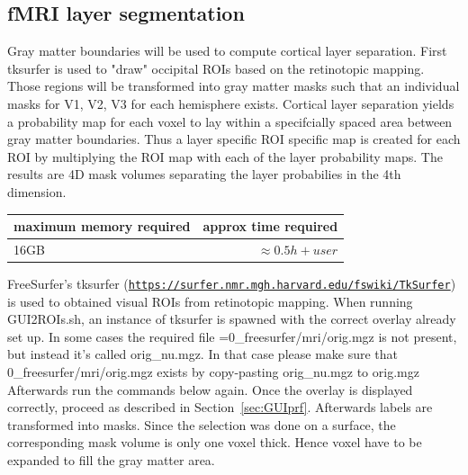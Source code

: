 \documentclass[12pt,a4paper]{scrartcl}
\begin{document}
\subsection{fMRI layer segmentation}
Gray matter boundaries will be used to compute cortical layer separation. First tksurfer is used to "draw" occipital ROIs based on the retinotopic mapping. Those regions will be transformed into gray matter masks such that an individual masks for V1, V2, V3 for each hemisphere exists. Cortical layer separation yields a probability map for each voxel to lay within a specifcially spaced area between gray matter boundaries. Thus a layer specific ROI specific map is created for each ROI by multiplying the ROI map with each of the layer probability maps. The results are 4D mask volumes separating the layer probabilies in the 4th dimension.
\begin{table}[h]
\begin{tabular}{l | r}
\toprule
maximum memory required & approx time required\\\toprule
16GB & $\approx 0.5h+user$ \\\bottomrule
\end{tabular}
\end{table}
\FloatBarrier
FreeSurfer's tksurfer (\href{https://surfer.nmr.mgh.harvard.edu/fswiki/TkSurfer}{\nolinkurl{https://surfer.nmr.mgh.harvard.edu/fswiki/TkSurfer}}) is used to obtained visual ROIs from retinotopic mapping. When running GUI2ROIs.sh, an instance of tksurfer is spawned with the correct overlay already set up. In some cases the required file =0\_freesurfer/mri/orig.mgz is not present, but instead it's called orig\_nu.mgz. In that case please make sure that 0\_freesurfer/mri/orig.mgz exists by copy-pasting orig\_nu.mgz to orig.mgz\\
Afterwards run the commands below again. Once the overlay is displayed correctly, proceed as described in Section~\ref{sec:GUIprf}. Afterwards labels are transformed into masks. Since the selection was done on a surface, the corresponding mask volume is only one voxel thick. Hence voxel have to be expanded to fill the gray matter area.\\
\end{document}
